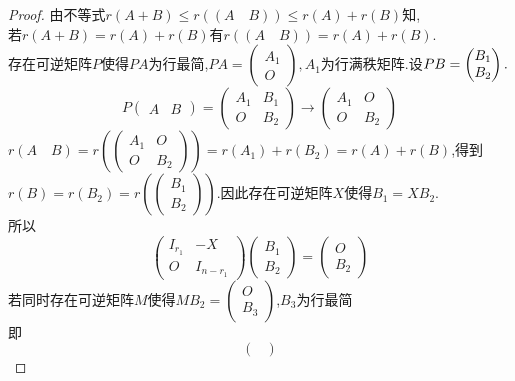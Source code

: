 \documentclass[11pt]{ctexart}
\theoremstyle{definition}
\numberwithin{equation}{section}
\begin{document}
\begin{proof}
    由不等式$r(A+B)\leq r((A\quad B))\leq r(A)+r(B)$知,\\
    若$r(A+B)=r(A)+r(B)$有$r((A\quad B))=r(A)+r(B)$.\\
    存在可逆矩阵$P$使得$PA$为行最简,$PA=\begin{pmatrix}
        A_1\\O
    \end{pmatrix},A_1$为行满秩矩阵.设$PB=\begin{pmatrix}
        B_1\\B_2
    \end{pmatrix}.\\$
    $$P\begin{pmatrix}
        A&B
    \end{pmatrix}=\begin{pmatrix}
        A_1&B_1\\O&B_2
    \end{pmatrix}\longrightarrow  \begin{pmatrix}
        A_1&O\\O&B_2
    \end{pmatrix}$$
    $r(A\quad B)=r\left(\begin{pmatrix}
        A_1&O\\O&B_2
    \end{pmatrix}\right)=r(A_1)+r(B_2)=r(A)+r(B)$,得到$r(B)=r(B_2)=r\left(\begin{pmatrix}
        B_1\\B_2
    \end{pmatrix}\right)$.因此存在可逆矩阵$X$使得$B_1=XB_2$.\\
    所以$$\begin{pmatrix}
        I_{r_1}&-X\\O&I_{n-r_1}
    \end{pmatrix}\begin{pmatrix}
            B_1\\B_2
        \end{pmatrix}=\begin{pmatrix}
            O\\B_2
        \end{pmatrix}$$
        若同时存在可逆矩阵$M$使得$MB_2=\begin{pmatrix}
            O\\B_3
        \end{pmatrix}$,$B_3$为行最简\\
        即$$\begin{pmatrix}

\end{pmatrix}$$
\end{proof}
\end{document}
